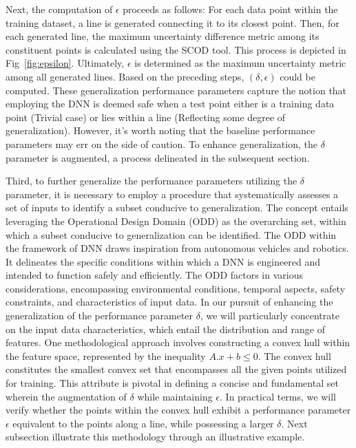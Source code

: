 Next, the computation of $\epsilon$ proceeds as follows: For each data point within the training dataset, a line is generated connecting it to its closest point. Then, for each generated line, the maximum uncertainty difference metric among its constituent points is calculated using the SCOD tool. This process is depicted in Fig~\ref{fig:epsilon}. Ultimately, $\epsilon$ is determined as the maximum uncertainty metric among all generated lines.   Based on the preceding steps, $(\delta,\epsilon)$  could be computed. These generalization performance parameters capture the notion that employing the DNN is deemed safe when a test point either is a training data point (Trivial case) or lies within a line (Reflecting some degree of generalization). However, it's worth noting that the baseline performance parameters  may err on the side of caution. To enhance generalization, the $\delta$ parameter is augmented, a process delineated in the subsequent section.

Third, to further generalize the performance parameters utilizing the $\delta$ parameter, it is necessary to employ a procedure that systematically assesses a set of inputs to identify a subset conducive to generalization. The concept entails leveraging the Operational Design Domain (ODD)\cite{saej3016,torfah2022learning,irvine2021two} as the overarching set, within which a subset conducive to generalization can be identified. 
The ODD within the framework of DNN draws inspiration from autonomous vehicles and robotics. It delineates the specific conditions within which a DNN is engineered and intended to function safely and efficiently. The ODD factors in various considerations, encompassing environmental conditions, temporal aspects, safety constraints, and characteristics of input data. In our pursuit of enhancing the generalization of the performance parameter $\delta$, we will particularly concentrate on the input data characteristics, which entail the distribution and range of features. One methodological approach involves constructing a convex hull within the feature space, represented by the inequality $A.x+b \leq 0$.  The convex hull constitutes the smallest convex set that encompasses all the given points utilized for training. This attribute is pivotal in defining a concise and fundamental set wherein the augmentation of $\delta$ while maintaining $\epsilon$.  In practical terms, we will verify whether the points within the convex hull exhibit a performance parameter $\epsilon$ equivalent to the points along a line, while possessing a larger $\delta$. 
Next subsection illustrate this methodology through an illustrative example.


